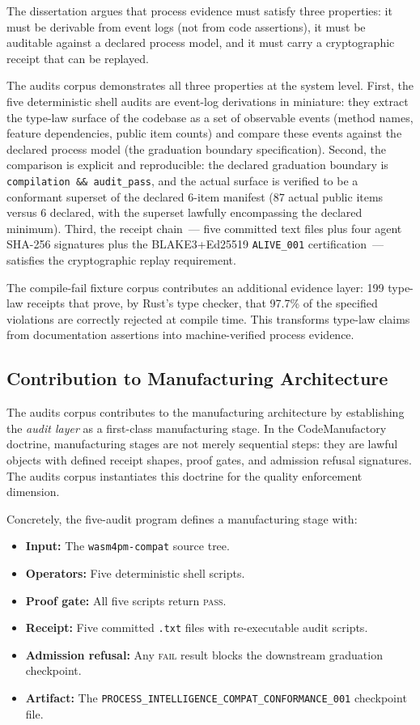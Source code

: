 The dissertation argues that process evidence must satisfy three properties: it
must be derivable from event logs (not from code assertions), it must be auditable
against a declared process model, and it must carry a cryptographic receipt that
can be replayed.

The audits corpus demonstrates all three properties at the system level. First,
the five deterministic shell audits are event-log derivations in miniature: they
extract the type-law surface of the codebase as a set of observable events
(method names, feature dependencies, public item counts) and compare these events
against the declared process model (the graduation boundary specification).
Second, the comparison is explicit and reproducible: the declared graduation
boundary is \texttt{compilation \&\& audit\_pass}, and the actual surface is
verified to be a conformant superset of the declared 6-item manifest (87 actual
public items versus 6 declared, with the superset lawfully encompassing the
declared minimum). Third, the receipt chain~--- five committed text files plus
four agent SHA-256 signatures plus the BLAKE3+Ed25519 \texttt{ALIVE\_001}
certification~--- satisfies the cryptographic replay requirement.

The compile-fail fixture corpus contributes an additional evidence layer: 199
type-law receipts that prove, by Rust's type checker, that 97.7\% of the
specified violations are correctly rejected at compile time. This transforms
type-law claims from documentation assertions into machine-verified process
evidence.

\subsection{Contribution to Manufacturing Architecture}
\label{sec:audits-contribution-manufacturing}

The audits corpus contributes to the manufacturing architecture by establishing
the \emph{audit layer} as a first-class manufacturing stage. In the CodeManufactory
doctrine, manufacturing stages are not merely sequential steps: they are lawful
objects with defined receipt shapes, proof gates, and admission refusal
signatures. The audits corpus instantiates this doctrine for the quality
enforcement dimension.

Concretely, the five-audit program defines a manufacturing stage with:
\begin{itemize}
  \item \textbf{Input:} The \texttt{wasm4pm-compat} source tree.
  \item \textbf{Operators:} Five deterministic shell scripts.
  \item \textbf{Proof gate:} All five scripts return \textsc{pass}.
  \item \textbf{Receipt:} Five committed \texttt{.txt} files with
    re-executable audit scripts.
  \item \textbf{Admission refusal:} Any \textsc{fail} result blocks the
    downstream graduation checkpoint.
  \item \textbf{Artifact:} The
    \texttt{PROCESS\_INTELLIGENCE\_COMPAT\_CONFORMANCE\_001} checkpoint file.
\end{itemize}

